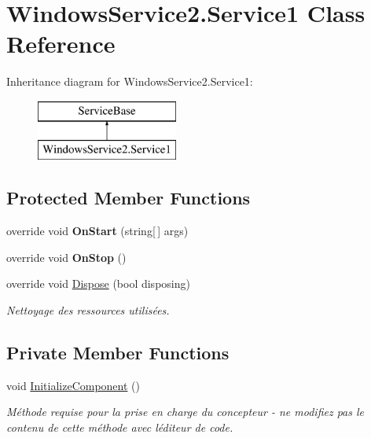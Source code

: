 \hypertarget{class_windows_service2_1_1_service1}{}\section{Windows\+Service2.\+Service1 Class Reference}
\label{class_windows_service2_1_1_service1}
Inheritance diagram for Windows\+Service2.\+Service1\+:\begin{figure}[H]
\begin{center}
\leavevmode
\includegraphics[height=2.000000cm]{class_windows_service2_1_1_service1}
\end{center}
\end{figure}
\subsection*{Protected Member Functions}
\begin{DoxyCompactItemize}
\item 
\mbox{\label{class_windows_service2_1_1_service1_a7d9b5a885bc3713034b13e2e8100fd68}} 
override void {\bfseries On\+Start} (string\mbox{[}$\,$\mbox{]} args)
\item 
\mbox{\label{class_windows_service2_1_1_service1_a25f5150d3c26bc7d9ea95166843de7f8}} 
override void {\bfseries On\+Stop} ()
\item 
override void \mbox{\hyperlink{class_windows_service2_1_1_service1_a35d81f8e347bf414b8163f34fd9d9796}{Dispose}} (bool disposing)
\begin{DoxyCompactList}\small\item\em Nettoyage des ressources utilisées. \end{DoxyCompactList}\end{DoxyCompactItemize}
\subsection*{Private Member Functions}
\begin{DoxyCompactItemize}
\item 
void \mbox{\hyperlink{class_windows_service2_1_1_service1_a7fde76cfc3883fd1d5c2ef3dad7c1038}{Initialize\+Component}} ()
\begin{DoxyCompactList}\small\item\em Méthode requise pour la prise en charge du concepteur -\/ ne modifiez pas le contenu de cette méthode avec l\textquotesingle{}éditeur de code. \end{DoxyCompactList}\end{DoxyCompactItemize}

